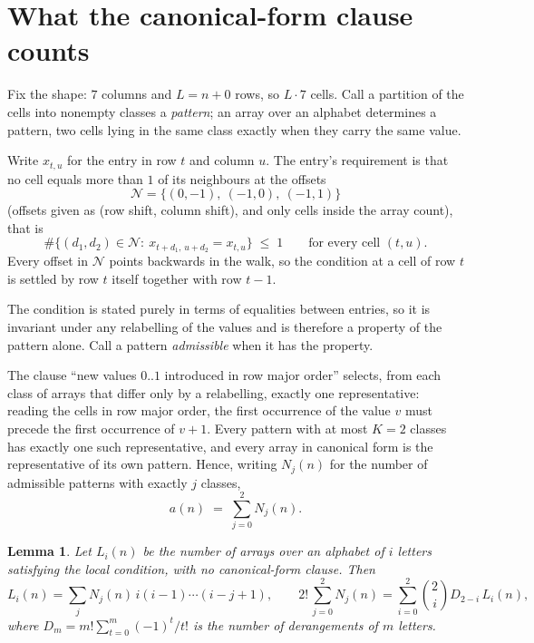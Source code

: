 \documentclass[11pt,a4paper]{article}
\theoremstyle{plain}
\newtheorem{lemma}[theorem]{Lemma}
\theoremstyle{definition}
\begin{document}
\section{What the canonical-form clause counts}

Fix the shape: $7$ columns and $L=n+0$ rows, so $L\cdot7$ cells. Call a
partition of the cells into nonempty classes a \emph{pattern}; an array over an alphabet
determines a pattern, two cells lying in the same class exactly when they carry the same
value.

Write $x_{t,u}$ for the entry in row $t$ and column $u$. The
entry's requirement is that no cell equals more than $1$ of its neighbours at the
offsets
\[
\mathcal N=\{(0,-1),\ (-1,0),\ (-1,1)\}
\]
(offsets given as (row shift, column shift), and only cells inside the array count),
that is
\begin{equation}\label{eq:loc}
\#\bigl\{(d_1,d_2)\in\mathcal N:\ x_{t+d_1,\,u+d_2}=x_{t,u}\bigr\}\;\le\;1
\qquad\text{for every cell }(t,u).
\end{equation}
Every offset in $\mathcal N$ points backwards in the walk, so the condition at a cell of
row $t$ is settled by row $t$ itself together with row $t-1$.

The condition is stated purely in terms of equalities between entries, so it is invariant
under any relabelling of the values and is therefore a property of the pattern alone. Call a
pattern \emph{admissible} when it has the property.

The clause ``new values $0..1$ introduced in row major order'' selects, from each class
of arrays that differ only by a relabelling, exactly one representative: reading the cells in
row major order, the first occurrence of the value $v$ must precede the first occurrence of
$v+1$. Every pattern with at most $K=2$ classes has exactly one such representative, and
every array in canonical form is the representative of its own pattern. Hence, writing
$N_j(n)$ for the number of admissible patterns with exactly $j$ classes,
\begin{equation}\label{eq:apat}
a(n)\;=\;\sum_{j=0}^{2}N_j(n).
\end{equation}

\begin{lemma}\label{lem:inv}
Let $L_i(n)$ be the number of arrays over an alphabet of $i$ letters satisfying the local
condition, with no canonical-form clause. Then
\[
L_i(n)=\sum_j N_j(n)\,i(i-1)\cdots(i-j+1),
\qquad
2!\,\sum_{j=0}^{2}N_j(n)=\sum_{i=0}^{2}\binom{2}{i}D_{2-i}\,L_i(n),
\]
where $D_m=m!\sum_{t=0}^{m}(-1)^t/t!$ is the number of derangements of $m$ letters.
\end{lemma}
\end{document}
